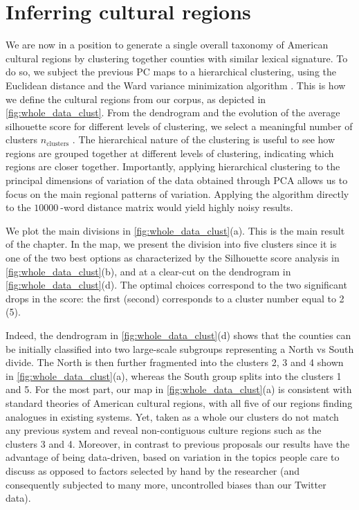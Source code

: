 \documentclass[../thesis.tex]{subfiles}
\begin{document}
\section{Inferring cultural regions}
We are now in a position to generate a single overall taxonomy of American cultural
regions by clustering together counties with similar lexical signature. To do so, we
subject the previous \ac{PC} maps to a hierarchical clustering, using the Euclidean
distance and the Ward variance minimization algorithm \cite{EverittClusterAnalysis2011}.
This is how we define the cultural regions from our corpus, as depicted in
\cref{fig:whole_data_clust}. From the dendrogram and the evolution of the average
silhouette score for different levels of clustering, we select a meaningful number of
clusters $n_{\text{clusters}}$ \cite{RousseeuwSilhouettesGraphical1987}. The
hierarchical nature of the clustering is useful to see how regions are grouped together
at different levels of clustering, indicating which regions are closer together.
Importantly, applying hierarchical clustering to the principal dimensions of variation
of the data obtained through \ac{PCA} allows us to focus on the main regional
patterns of variation. Applying the algorithm directly to the $\SI{10000}{}$-word
distance matrix would yield highly noisy results.

We plot the main divisions in \cref{fig:whole_data_clust}(a). This is the main result of
the chapter. In the map, we present the division into five clusters since it is one of the
two best options as characterized by the Silhouette score analysis in
\cref{fig:whole_data_clust}(b), and at a clear-cut on the dendrogram in
\cref{fig:whole_data_clust}(d). The optimal choices correspond to the two significant
drops in the score: the first (second) corresponds to a cluster number equal to 2 (5). 

Indeed, the dendrogram in \cref{fig:whole_data_clust}(d) shows that the counties can be
initially classified into two large-scale subgroups representing a North vs South
divide. The North is then further fragmented into the clusters 2, 3 and 4 shown in
\cref{fig:whole_data_clust}(a), whereas the South group splits into the clusters 1 and
5. For the most part, our map in \cref{fig:whole_data_clust}(a) is consistent with
standard theories of American cultural regions, with all five of our regions finding
analogues in existing systems. Yet, taken as a whole our clusters do not match any
previous system and reveal non-contiguous culture regions such as the clusters 3 and 4.
Moreover, in contrast to previous proposals our results have the advantage of being
data-driven, based on variation in the topics people care to discuss as opposed to
factors selected by hand by the researcher (and consequently subjected to many more,
uncontrolled biases than our Twitter data).
\end{document}

